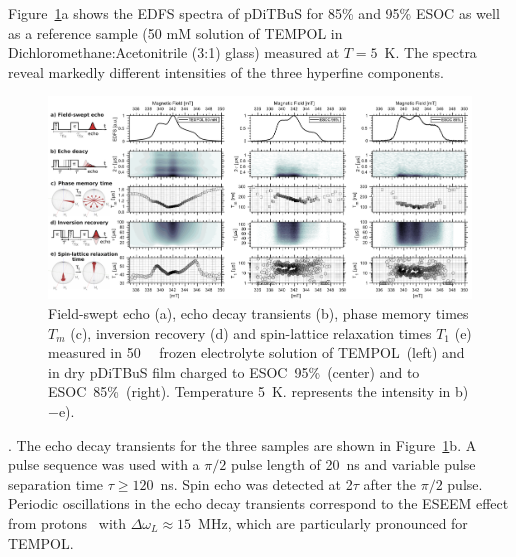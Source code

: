 Figure~\ref{fig:Figure_5}a shows the EDFS spectra of pDiTBuS for 85\% and 95\% ESOC as well as a reference sample (50 mM solution of TEMPOL in Dichloromethane:Acetonitrile (3:1) glass) measured at $T=5$~K. The spectra reveal markedly different intensities of the three hyperfine components.\\

\begin{figure}[ht]
	\includegraphics[width=1\textwidth]{./pulse/figures/Figure_5.pdf}%
	\caption{Field-swept echo (a), echo decay transients (b), phase memory times $T_m$ (c), inversion recovery (d) and spin-lattice relaxation times $T_1$ (e) measured in 50~\si{\milli\Molar}  frozen electrolyte solution of TEMPOL~(left) and in dry pDiTBuS film charged to ESOC~95\%~(center) and to ESOC~85\%~(right). Temperature 5~K.  represents the intensity in b)$-$e).}
	\label{fig:Figure_5}
\end{figure}


. The echo decay transients for the three samples are shown in Figure~\ref{fig:Figure_5}b. A  pulse sequence was used with a $\pi/2$ pulse length of 20~ns and variable pulse separation time $\tau\geq120$~ns. Spin echo was detected at 2$\tau$ after the $\pi/2$ pulse. Periodic oscillations in the echo decay transients correspond to the ESEEM effect from protons~\cite{Schweiger2001} with $\Delta\omega_L\approx15$~MHz, which are particularly pronounced for TEMPOL.\\ 

